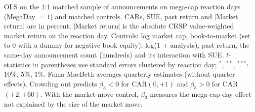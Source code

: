 \begin{table}[htbp]
\par\medskip
\parbox{0.95\linewidth}{\footnotesize OLS on the 1:1 matched sample of announcements on mega-cap reaction days (MegaDay $=1$) and matched controls. CARs, SUE, past return and $|$Market return$|$ are in percent; $|$Market return$|$ is the absolute CRSP value-weighted market return on the reaction day. Controls: log market cap, book-to-market (set to 0 with a dummy for negative book equity), log(1 + analysts), past return, the same-day announcement count (hundreds) and its interaction with SUE. $t$-statistics in parentheses use standard errors clustered by reaction day; $^{*}$, $^{**}$, $^{***}$: 10\%, 5\%, 1\%. Fama-MacBeth averages quarterly estimates (without quarter effects). Crowding out predicts $\beta_3<0$ for CAR$(0,+1)$ and $\beta_3>0$ for CAR$(+2,+60)$. With the market-move control, $\beta_3$ measures the mega-cap-day effect not explained by the size of the market move.}
\end{table}
